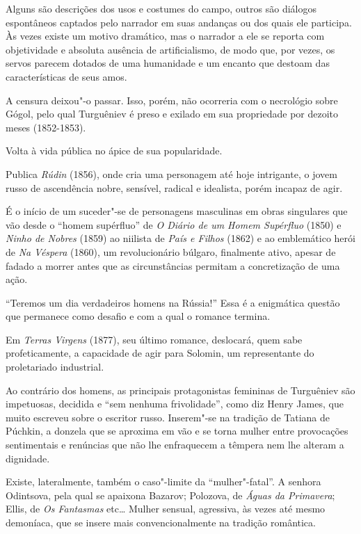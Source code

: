 Alguns são descrições dos usos e costumes do campo, outros são diálogos
espontâneos captados pelo narrador em suas andanças ou dos quais ele
participa. Às vezes existe um motivo dramático, mas o narrador a ele se
reporta com objetividade e absoluta ausência de artificialismo, de modo
que, por vezes, os servos parecem dotados de uma humanidade e um encanto
que destoam das características de seus amos.

A censura deixou"-o passar. Isso, porém, não ocorreria com o necrológio
sobre Gógol, pelo qual Turguêniev é preso e exilado em sua propriedade
por dezoito meses (1852-1853).

Volta à vida pública no ápice de sua popularidade.

Publica \emph{Rúdin} (1856), onde cria uma personagem até hoje
intrigante, o jovem russo de ascendência nobre, sensível, radical e
idealista, porém incapaz de agir.

É o início de um suceder"-se de personagens masculinas em obras
singulares que vão desde o ``homem supérfluo'' de \emph{O Diário de um
Homem Supérfluo} (1850) e \emph{Ninho de Nobres} (1859) ao niilista de
\emph{País e Filhos} (1862) e ao emblemático herói de \emph{Na Véspera}
(1860), um revolucionário búlgaro, finalmente ativo, apesar de fadado a
morrer antes que as circunstâncias permitam a concretização de uma ação.

``Teremos um dia verdadeiros homens na Rússia!'' Essa é a enigmática
questão que permanece como desafio e com a qual o romance termina.

Em \emph{Terras Virgens} (1877), seu último romance, deslocará, quem
sabe profeticamente, a capacidade de agir para Solomin, um representante
do proletariado industrial.

Ao contrário dos homens, as principais protagonistas femininas de
Turguêniev são impetuosas, decidida e ``sem nenhuma frivolidade'', como
diz Henry James, que muito escreveu sobre o escritor russo. Inserem"-se
na tradição de Tatiana de Púchkin, a donzela que se aproxima em vão e se
torna mulher entre provocações sentimentais e renúncias que não lhe
enfraquecem a têmpera nem lhe alteram a dignidade.

Existe, lateralmente, também o caso"-limite da ``mulher"-fatal''. A
senhora Odintsova, pela qual se apaixona Bazarov; Polozova, de
\emph{Águas da Primavera}; Ellis, de \emph{Os Fantasmas} etc\ldots{} Mulher
sensual, agressiva, às vezes até mesmo demoníaca, que se insere mais
convencionalmente na tradição romântica.

